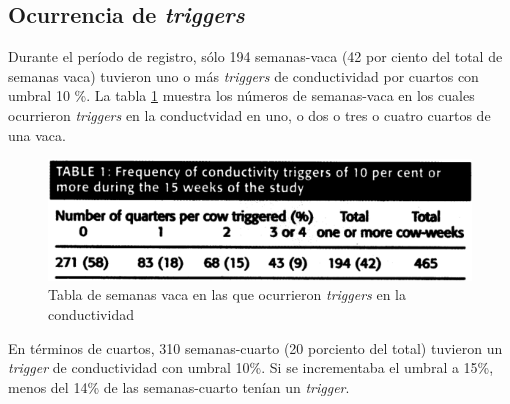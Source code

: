 \documentclass[a4paper, 11pt]{article}
\begin{document}
\subsection{Ocurrencia de \emph{triggers}}
Durante el período de registro, sólo 194 semanas-vaca (42 por ciento del total de semanas vaca) tuvieron uno o más \emph{triggers} de conductividad por cuartos con umbral 10 \%. La tabla \ref{fig:semanasvaca} muestra los números de semanas-vaca en los cuales ocurrieron \emph{triggers} en la conductvidad en uno, o dos o tres o cuatro cuartos de una vaca.
\begin{figure}[H]
	\centering
	\includegraphics[width=1.0\linewidth]{img/Table1}
	\caption{Tabla de semanas vaca en las que ocurrieron \emph{triggers} en la conductividad \label{fig:semanasvaca}}
\end{figure}

En términos de cuartos, 310 semanas-cuarto (20 porciento del total) tuvieron un \emph{trigger} de conductividad con umbral 10\%. Si se incrementaba el umbral a 15\%, menos del 14\% de las semanas-cuarto tenían un \emph{trigger}.
\end{document}

